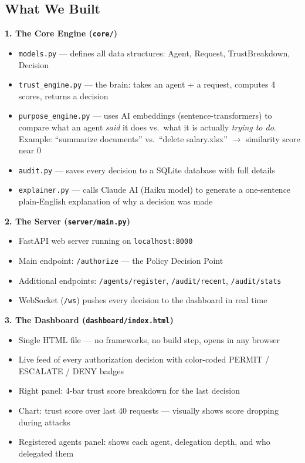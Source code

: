 \documentclass[12pt, a4paper]{article}
\begin{document}
\subsection{What We Built}

\textbf{1. The Core Engine (\texttt{core/})}
\begin{itemize}[noitemsep]
  \item \texttt{models.py} — defines all data structures: Agent, Request, TrustBreakdown, Decision
  \item \texttt{trust\_engine.py} — the brain: takes an agent + a request, computes 4 scores, returns a decision
  \item \texttt{purpose\_engine.py} — uses AI embeddings (sentence-transformers) to compare what an agent \textit{said} it does vs.\ what it is actually \textit{trying to do}. Example: ``summarize documents'' vs.\ ``delete salary.xlsx'' $\rightarrow$ similarity score near 0
  \item \texttt{audit.py} — saves every decision to a SQLite database with full details
  \item \texttt{explainer.py} — calls Claude AI (Haiku model) to generate a one-sentence plain-English explanation of why a decision was made
\end{itemize}

\textbf{2. The Server (\texttt{server/main.py})}
\begin{itemize}[noitemsep]
  \item FastAPI web server running on \texttt{localhost:8000}
  \item Main endpoint: \texttt{/authorize} — the Policy Decision Point
  \item Additional endpoints: \texttt{/agents/register}, \texttt{/audit/recent}, \texttt{/audit/stats}
  \item WebSocket (\texttt{/ws}) pushes every decision to the dashboard in real time
\end{itemize}

\textbf{3. The Dashboard (\texttt{dashboard/index.html})}
\begin{itemize}[noitemsep]
  \item Single HTML file — no frameworks, no build step, opens in any browser
  \item Live feed of every authorization decision with color-coded PERMIT / ESCALATE / DENY badges
  \item Right panel: 4-bar trust score breakdown for the last decision
  \item Chart: trust score over last 40 requests — visually shows score dropping during attacks
  \item Registered agents panel: shows each agent, delegation depth, and who delegated them
\end{itemize}
\end{document}
